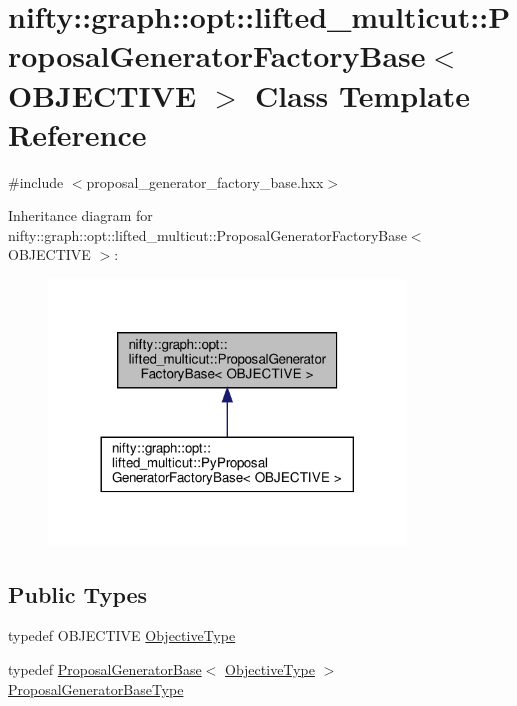 \hypertarget{classnifty_1_1graph_1_1opt_1_1lifted__multicut_1_1ProposalGeneratorFactoryBase}{}\section{nifty\+:\+:graph\+:\+:opt\+:\+:lifted\+\_\+multicut\+:\+:Proposal\+Generator\+Factory\+Base$<$ O\+B\+J\+E\+C\+T\+I\+VE $>$ Class Template Reference}
\label{classnifty_1_1graph_1_1opt_1_1lifted__multicut_1_1ProposalGeneratorFactoryBase}


{\ttfamily \#include $<$proposal\+\_\+generator\+\_\+factory\+\_\+base.\+hxx$>$}



Inheritance diagram for nifty\+:\+:graph\+:\+:opt\+:\+:lifted\+\_\+multicut\+:\+:Proposal\+Generator\+Factory\+Base$<$ O\+B\+J\+E\+C\+T\+I\+VE $>$\+:
\nopagebreak
\begin{figure}[H]
\begin{center}
\leavevmode
\includegraphics[width=269pt]{classnifty_1_1graph_1_1opt_1_1lifted__multicut_1_1ProposalGeneratorFactoryBase__inherit__graph}
\end{center}
\end{figure}
\subsection*{Public Types}
\begin{DoxyCompactItemize}
\item 
typedef O\+B\+J\+E\+C\+T\+I\+VE \hyperlink{classnifty_1_1graph_1_1opt_1_1lifted__multicut_1_1ProposalGeneratorFactoryBase_a1986f0a3868e76ba5613f49ca4fc7dc6}{Objective\+Type}
\item 
typedef \hyperlink{classnifty_1_1graph_1_1opt_1_1lifted__multicut_1_1ProposalGeneratorBase}{Proposal\+Generator\+Base}$<$ \hyperlink{classnifty_1_1graph_1_1opt_1_1lifted__multicut_1_1ProposalGeneratorFactoryBase_a1986f0a3868e76ba5613f49ca4fc7dc6}{Objective\+Type} $>$ \hyperlink{classnifty_1_1graph_1_1opt_1_1lifted__multicut_1_1ProposalGeneratorFactoryBase_ab201fe6397370621b50977e67ae55ace}{Proposal\+Generator\+Base\+Type}
\end{DoxyCompactItemize}
